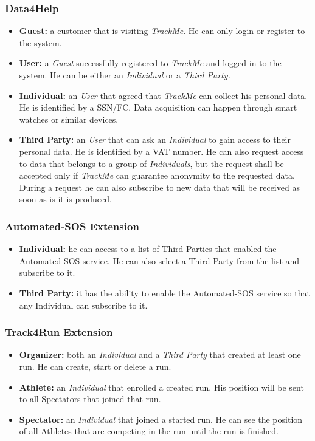 \documentclass[a4paper]{article}
\begin{document}
        \subsubsection{Data4Help}
        \begin{itemize}
            \item \textbf{Guest:} a customer that is visiting \textit{TrackMe}. He can only login or register to the system.
            \item \textbf{User:} a \textit{Guest} successfully registered to \textit{TrackMe} and logged in to the system. He can be either an \textit{Individual} or a \textit{Third Party.}
            \item \textbf{Individual:} an \textit{User} that agreed that \textit{TrackMe} can collect his personal data. He is identified by a SSN/FC. Data acquisition can happen through smart watches or similar devices.
            \item \textbf{Third Party:} an \textit{User} that can ask an \textit{Individual} to gain access to their personal data. He is identified by a VAT number. He can also request access to data that belongs to a group of \textit{Individuals}, but the request shall be accepted only if \textit{TrackMe} can guarantee anonymity to the requested data. During a request he can also subscribe to new data that will be received as soon as is it is produced.
        \end{itemize}

        \subsubsection{Automated-SOS Extension}
        \begin{itemize}
            \item \textbf{Individual:} he can access to a list of Third Parties that enabled the Automated-SOS service. He can also select a Third Party from the list and subscribe to it.
            \item \textbf{Third Party:} it has the ability to enable the Automated-SOS service so that any Individual can subscribe to it.
        \end{itemize}
        
        \subsubsection{Track4Run Extension}
        \begin{itemize}
            \item \textbf{Organizer:} both an \textit{Individual} and a \textit{Third Party} that created at least one run. He can create, start or delete a run.
            \item \textbf{Athlete:} an \textit{Individual} that enrolled a created run. His position will be sent to all Spectators that joined that run.
            \item \textbf{Spectator:} an \textit{Individual} that joined a started run. He can see the position of all Athletes that are competing in the run until the run is finished.
        \end{itemize}
        
\end{document}

